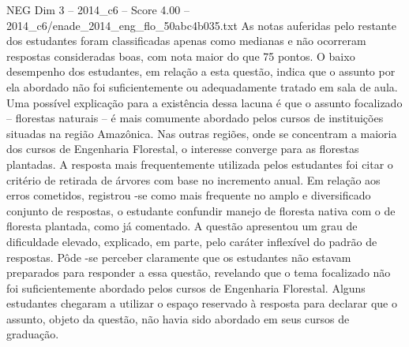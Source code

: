 \begin{textsample}{NEG Dim 3 – 2014\_c6 – Score 4.00 – 2014\_c6/enade\_2014\_eng\_flo\_50abc4b035.txt}
As notas auferidas pelo restante dos estudantes foram classificadas apenas como medianas e não ocorreram respostas consideradas boas, com nota maior do que 75 pontos.
O baixo desempenho dos estudantes, em relação a esta questão, indica que o assunto por ela abordado não foi suficientemente ou adequadamente tratado em sala de aula.
Uma possível explicação para a existência dessa lacuna é que o assunto focalizado – florestas naturais – é mais comumente abordado pelos cursos de instituições situadas na região Amazônica.
Nas outras regiões, onde se concentram a maioria dos cursos de Engenharia Florestal, o interesse converge para as florestas plantadas.
A resposta mais frequentemente utilizada pelos estudantes foi citar o critério de retirada de árvores com base no incremento anual.
Em relação aos erros cometidos, registrou -se como mais frequente no amplo e diversificado conjunto de respostas, o estudante confundir manejo de floresta nativa com o de floresta plantada, como já comentado.
A questão apresentou um grau de dificuldade elevado, explicado, em parte, pelo caráter inflexível do padrão de respostas.
Pôde -se perceber claramente que os estudantes não estavam preparados para responder a essa questão, revelando que o tema focalizado não foi suficientemente abordado pelos cursos de Engenharia Florestal.
Alguns estudantes chegaram a utilizar o espaço reservado à resposta para declarar que o assunto, objeto da questão, não havia sido abordado em seus cursos de graduação.

\end{textsample}
